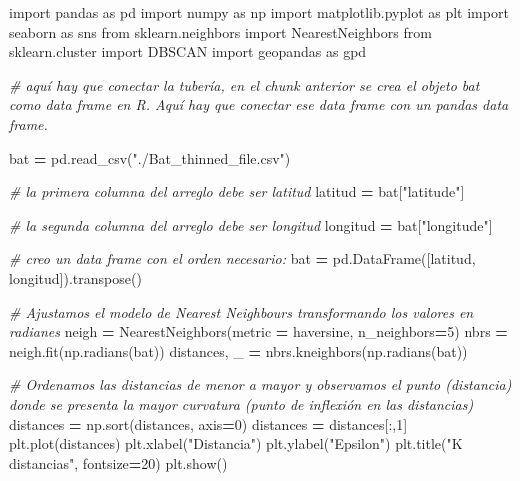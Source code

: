 \documentclass[
]{article}
\newenvironment{Shaded}{\begin{snugshade}}{\end{snugshade}}
\newcommand{\CommentTok}[1]{\textcolor[rgb]{0.56,0.35,0.01}{\textit{#1}}}
\newcommand{\DecValTok}[1]{\textcolor[rgb]{0.00,0.00,0.81}{#1}}
\newcommand{\ImportTok}[1]{#1}
\newcommand{\NormalTok}[1]{#1}
\newcommand{\OperatorTok}[1]{\textcolor[rgb]{0.81,0.36,0.00}{\textbf{#1}}}
\newcommand{\StringTok}[1]{\textcolor[rgb]{0.31,0.60,0.02}{#1}}
\begin{document}
\begin{Shaded}
\begin{Highlighting}[]
\ImportTok{import}\NormalTok{ pandas }\ImportTok{as}\NormalTok{ pd}
\ImportTok{import}\NormalTok{ numpy }\ImportTok{as}\NormalTok{ np}
\ImportTok{import}\NormalTok{ matplotlib.pyplot }\ImportTok{as}\NormalTok{ plt}
\ImportTok{import}\NormalTok{ seaborn }\ImportTok{as}\NormalTok{ sns}
\ImportTok{from}\NormalTok{ sklearn.neighbors }\ImportTok{import}\NormalTok{ NearestNeighbors}
\ImportTok{from}\NormalTok{ sklearn.cluster }\ImportTok{import}\NormalTok{ DBSCAN}
\ImportTok{import}\NormalTok{ geopandas }\ImportTok{as}\NormalTok{ gpd}

\CommentTok{\# aquí hay que conectar la tubería, en el chunk anterior se crea el objeto bat como data frame en R. Aquí hay que conectar ese data frame con un pandas data frame.}

\NormalTok{bat }\OperatorTok{=}\NormalTok{ pd.read\_csv(}\StringTok{"./Bat\_thinned\_file.csv"}\NormalTok{)}

\CommentTok{\# la primera columna del arreglo debe ser latitud}
\NormalTok{latitud }\OperatorTok{=}\NormalTok{ bat[}\StringTok{"latitude"}\NormalTok{]}

\CommentTok{\# la segunda columna del arreglo debe ser longitud}
\NormalTok{longitud }\OperatorTok{=}\NormalTok{ bat[}\StringTok{"longitude"}\NormalTok{]}

\CommentTok{\# creo un data frame con el orden necesario:}
\NormalTok{bat }\OperatorTok{=}\NormalTok{ pd.DataFrame([latitud, longitud]).transpose()}

\CommentTok{\# Ajustamos el modelo de Nearest Neighbours transformando los valores en radianes}
\NormalTok{neigh }\OperatorTok{=}\NormalTok{ NearestNeighbors(metric }\OperatorTok{=} \StringTok{\textquotesingle{}haversine\textquotesingle{}}\NormalTok{, n\_neighbors}\OperatorTok{=}\DecValTok{5}\NormalTok{)}
\NormalTok{nbrs }\OperatorTok{=}\NormalTok{ neigh.fit(np.radians(bat))}
\NormalTok{distances, \_ }\OperatorTok{=}\NormalTok{ nbrs.kneighbors(np.radians(bat))}

\CommentTok{\# Ordenamos las distancias de menor a mayor y observamos el punto (distancia) donde se presenta la mayor curvatura (punto de inflexión en las distancias)}
\NormalTok{distances }\OperatorTok{=}\NormalTok{ np.sort(distances, axis}\OperatorTok{=}\DecValTok{0}\NormalTok{)}
\NormalTok{distances }\OperatorTok{=}\NormalTok{ distances[:,}\DecValTok{1}\NormalTok{]}
\NormalTok{plt.plot(distances)}
\NormalTok{plt.xlabel(}\StringTok{"Distancia"}\NormalTok{)}
\NormalTok{plt.ylabel(}\StringTok{"Epsilon"}\NormalTok{)}
\NormalTok{plt.title(}\StringTok{"K distancias"}\NormalTok{, fontsize}\OperatorTok{=}\DecValTok{20}\NormalTok{)}
\NormalTok{plt.show()}
\end{Highlighting}
\end{Shaded}
\end{document}
